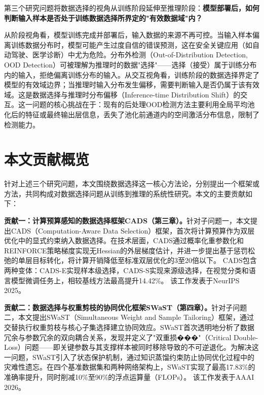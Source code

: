 第三个研究问题将数据选择的视角从训练阶段延伸至推理阶段：\textbf{模型部署后，如何判断输入样本是否处于训练数据选择所界定的"有效数据域"内？}

从阶段视角看，模型训练完成并部署后，输入数据的来源不再可控。当输入样本偏离训练数据分布时，模型可能产生过度自信的错误预测\cite{hendrycks2016msp}，这在安全关键应用（如自动驾驶\cite{filos2020can, janai2020computer}、医学诊断\cite{pooch2020can}）中尤为危险。分布外检测（Out-of-Distribution Detection, OOD Detection）可被理解为推理时的数据"选择"——选择（接受）属于训练分布内的输入，拒绝偏离训练分布的输入\cite{yang2021generalized_survey}。从交互视角看，训练阶段的数据选择界定了模型的有效域边界；当推理时输入分布发生偏移，需要判断输入是否仍属于该有效域。这是数据选择与推理时分布偏移（Inference-time Distribution Shift）的交互。这一问题的核心挑战在于：现有的后处理OOD检测方法主要利用全局平均池化后的特征或最终输出层信息\cite{liu2020energy, hendrycks2016msp, sun2021react, sun2022dice}，丢失了池化前通道内的空间激活分布信息，限制了检测能力。


\section{本文贡献概览}

针对上述三个研究问题，本文围绕数据选择这一核心方法论，分别提出一个框架或方法，共同构成对数据选择问题从训练到推理的系统性研究。本文的主要贡献如下：

\textbf{贡献一：计算预算感知的数据选择框架CADS（第三章）。}针对子问题一，本文提出CADS（Computation-Aware Data Selection）框架，首次将计算预算作为双层优化中的显式约束纳入数据选择\cite{zhou2022probabilistic}。在技术层面，CADS通过概率化重参数化和REINFORCE策略梯度实现无Hessian的外层梯度估计，并进一步提出基于惩罚松弛的单层目标转化，将计算开销降低至标准双层优化的3至20倍以下。%
CADS包含两种变体：CADS-E实现样本级选择，CADS-S实现来源级选择，在视觉分类和语言模型微调任务上，相较基线方法最高提升14.42\%。%
该工作发表于NeurIPS 2025。

\textbf{贡献二：数据选择与权重剪枝的协同优化框架SWaST（第四章）。}针对子问题二，本文提出SWaST（Simultaneous Weight and Sample Tailoring）框架，通过交替执行权重剪枝与核心子集选择建立协同效应。SWaST首次透明地分析了数据冗余与参数冗余的双向耦合关系，发现并定义了"双重损���"（Critical Double-Loss）问题——即关键参数与其支撑样本被同时移除导致的不可逆退化。为解决这一问题，SWaST引入了状态保护机制，通过知识蒸馏约束防止协同优化过程中的灾难性遗忘。在四个基准数据集和两种网络架构上，SWaST实现了最高17.83\%的准确率提升，同时削减10\%至90\%的浮点运算量（FLOPs）。%
该工作发表于AAAI 2026。

